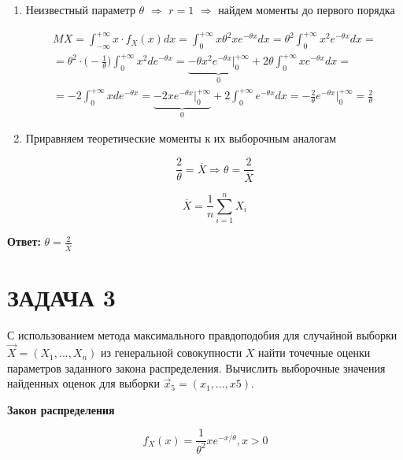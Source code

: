 \begin{enumerate}
    \item Неизвестный параметр $\theta$ $\Rightarrow$ $r = 1$ $\Rightarrow$ найдем моменты до первого порядка

        \begin{multline*}
            MX = \int_{-\infty}^{+\infty} x \cdot f_X(x) dx = \int_0^{+\infty} x \theta^2 xe^{-\theta x} dx = \theta^2 \int_{0}^{+\infty} x^2 e^{-\theta x} dx = \\
            = \theta^2 \cdot \bigg( - \frac{1}{\theta} \bigg) \int_0^{+\infty} x^2 de^{-\theta x} = \underbrace{-\theta x^2 e^{-\theta x} \bigg|_0^{+\infty}}_{0} + 2\theta \int_0^{+\infty} xe^{-\theta x} dx = \\
            = -2 \int_0^{+\infty} xde^{-\theta x} = \underbrace{-2 xe^{-\theta x} \bigg|_0^{+\infty}}_{0} + 2 \int_0^{+\infty} e^{-\theta x} dx = -\frac{2}{\theta} e^{-\theta x} \bigg|_0^{+\infty} = \frac{2}{\theta}
        \end{multline*}

    \item Приравняем теоретические моменты к их выборочным аналогам

        \begin{equation*}
            \frac{2}{\theta} = \overline X \Rightarrow \theta = \frac{2}{\overline X}
        \end{equation*}

        \begin{equation*}
            \overline X = \frac{1}{n} \sum_{i=1}^n X_i
        \end{equation*}
\end{enumerate}

\textbf{Ответ:} $\theta = \frac{2}{\overline X}$

\section{ЗАДАЧА 3}

С использованием метода максимального правдоподобия для случайной выборки $\vec X = (X_1, ..., X_n)$ из генеральной совокупности $X$ найти точечные оценки параметров заданного закона распределения. Вычислить выборочные значения найденных оценок для выборки $\vec x_5 = (x_1, ..., x5)$.

\textbf{Закон распределения}

\begin{equation*}
    f_X(x) = \frac{1}{\theta^2} xe^{-x / \theta}, x > 0
\end{equation*}

